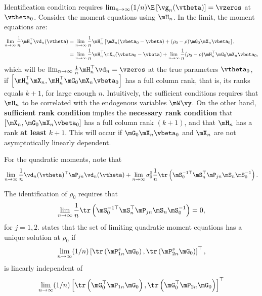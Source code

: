 Identification condition requires $\lim_{n\to\infty}(1/n)\E\left[\vg_n(\vtheta)\right] = \vzeros$ at $\vtheta_0$. Consider the moment equations using $\mH_n$. In the limit, the moment equations are:
\begin{equation*}
\begin{aligned}
\lim_{n\to\infty}\frac{1}{n}\mH_n^\top\vd_n(\vtheta) & = \lim_{n\to\infty}\frac{1}{n}\mH_n^\top\left[\mX_n(\vbeta_0 - \vbeta) + (\rho_0 - \rho)\mG_0\mX_n\vbeta_0\right], \\
& = \lim_{n\to\infty}\frac{1}{n}\mH_n^\top\mX_n(\vbeta_0 - \vbeta) + \lim_{n\to\infty}\frac{1}{n}(\rho_0 - \rho)\mH_n^\top\mG_0\mX_n\vbeta_0, \\
\end{aligned}
\end{equation*}
%
which will be $\lim_{n\to\infty}\frac{1}{n}\mH_n^\top\vd_n = \vzeros$ at the true parameters $\vtheta_0$, if $\left[\mH_n^\top\mX_n, \mH_n^\top\mG_0\mX_n\vbeta_0\right]$ has a full column rank, that is, its ranks equals $k + 1$, for large enough $n$. Intuitively, the sufficient conditions requires that $\mH_n$ to be correlated with the endogenous variables $\mW\vy$. On the other hand,  \textbf{sufficient rank condition} implies the \textbf{necessary rank condition} that $\left[\mX_n, \mG_0\mX_n\vbeta_0\right]$ has a full column rank $(k + 1)$, and that $\mH_n$ has a rank \textbf{at least} $k + 1$. This will occur if $\mG_0\mX_n\vbeta_0$ and $\mX_n$ are not asymptotically linearly dependent. 

For the quadratic moments, note that
\begin{equation*}
  \lim_{n\to\infty}\frac{1}{n}\vd_n(\vtheta)^\top\mP_{jn}\vd_n(\vtheta) + \lim_{n\to\infty}\sigma_0^2\frac{1}{n}\tr\left(\mS_0^{-1\top}\mS_n^\top\mP_{jn}\mS_n\mS_0^{-1}\right).
\end{equation*}

The identification of $\rho_0$ requires that
\begin{equation*}
\lim_{n\to\infty}\frac{1}{n}\tr\left(\mS_0^{-1\top}\mS_n^\top\mP_{jn}\mS_n\mS_0^{-1}\right) = 0,
\end{equation*}
%
for $j= 1, 2$. \cite{lee2007gmm} states that the set of limiting quadratic moment equations has a unique solution at $\rho_0$ if 
\begin{equation*}
      \lim_{n\to\infty}(1/n)\left[\tr\left(\mP_{1n}^s\mG_0\right), \tr\left(\mP_{2n}^s\mG_0\right)\right]^\top, 
    \end{equation*}
    is linearly independent of 
\begin{equation*}
    \begin{aligned}
    \lim_{n\to\infty}(1/n)\left[\tr\left(\mG_0^\top\mP_{1n}\mG_0\right), \tr\left(\mG_0^\top\mP_{2n}\mG_0\right)\right]^\top
    \end{aligned}
\end{equation*}
    
